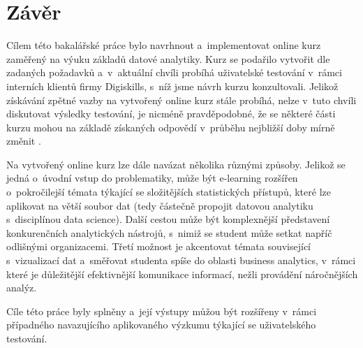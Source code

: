 \hypertarget{zuxe1vux11br}{%
\chapter*{Závěr}\label{zaver}}

Cílem této bakalářské práce bylo navrhnout a~implementovat online kurz zaměřený na výuku základů datové analytiky. Kurz se podařilo vytvořit dle zadaných požadavků a~v~aktuální chvíli probíhá uživatelské testování v~rámci interních klientů firmy Digiskills, s~níž jsme návrh kurzu konzultovali. Jelikož získávání zpětné vazby na vytvořený online kurz stále probíhá, nelze v~tuto chvíli diskutovat výsledky testování, je nicméně pravděpodobné, že se některé části kurzu mohou na základě získaných odpovědí v~průběhu nejbližší doby mírně změnit .

Na vytvořený online kurz lze dále navázat několika různými způsoby. Jelikož se jedná o~úvodní vstup do problematiky, může být e-learning rozšířen o~pokročilejší témata týkající se složitějších statistických přístupů, které lze aplikovat na větší soubor dat (tedy částečně propojit datovou analytiku s~disciplínou data science). Další cestou může být komplexnější představení konkurenčních analytických nástrojů, s~nimiž se student může setkat napříč odlišnými organizacemi. Třetí možnost je akcentovat témata související s~vizualizací dat a~směřovat studenta spíše do oblasti business analytics, v~rámci které je důležitější efektivnější komunikace informací, nežli provádění náročnějších analýz.

Cíle této práce byly splněny a~její výstupy můžou být rozšířeny v~rámci případného navazujícího aplikovaného výzkumu týkající se uživatelského testování.
